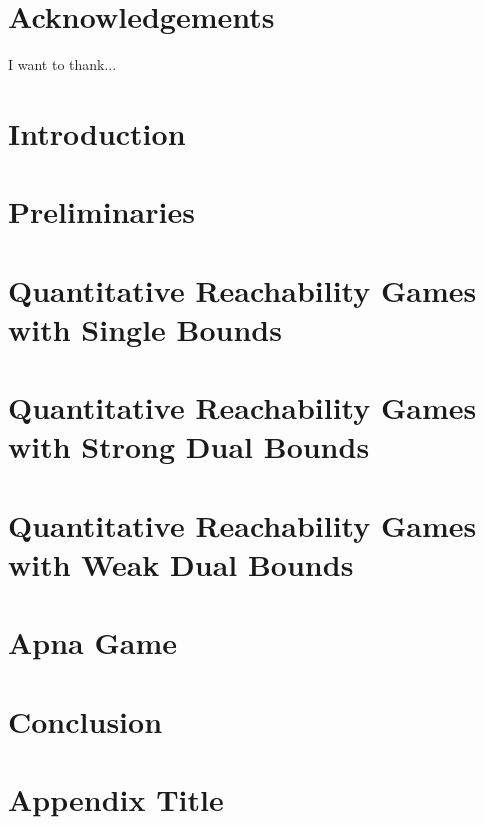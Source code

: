 \documentclass[a4paper, 11pt, oneside]{book}
\theoremstyle{definition}
\begin{document}
\chapter*{Acknowledgements}
I want to thank...

\tableofcontents

\chapter{Introduction}

 
\chapter{Preliminaries}

 
\chapter{Quantitative Reachability Games with Single Bounds}

 
\chapter{Quantitative Reachability Games with Strong Dual Bounds}


\chapter{Quantitative Reachability Games with Weak Dual Bounds}

 
\chapter{Apna Game}


\chapter{Conclusion}





\appendix
\chapter{Appendix Title}

\end{document}
